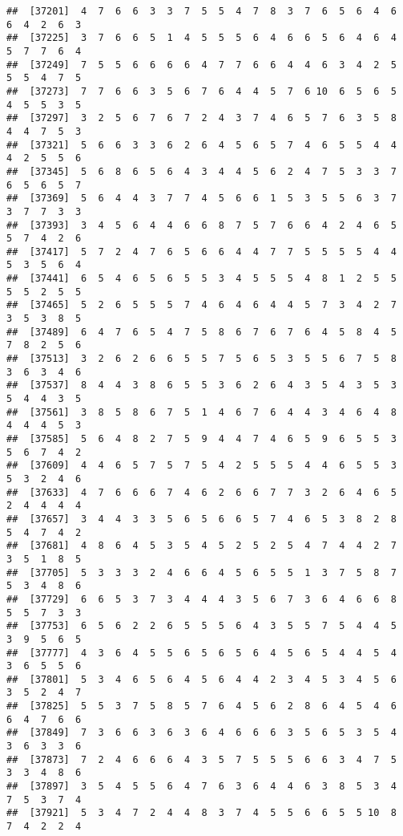 \documentclass[
]{book}
\begin{document}
\begin{verbatim}
##  [37201]  4  7  6  6  3  3  7  5  5  4  7  8  3  7  6  5  6  4  6  6  4  2  6  3
##  [37225]  3  7  6  6  5  1  4  5  5  5  6  4  6  6  5  6  4  6  4  5  7  7  6  4
##  [37249]  7  5  5  6  6  6  6  4  7  7  6  6  4  4  6  3  4  2  5  5  5  4  7  5
##  [37273]  7  7  6  6  3  5  6  7  6  4  4  5  7  6 10  6  5  6  5  4  5  5  3  5
##  [37297]  3  2  5  6  7  6  7  2  4  3  7  4  6  5  7  6  3  5  8  4  4  7  5  3
##  [37321]  5  6  6  3  3  6  2  6  4  5  6  5  7  4  6  5  5  4  4  4  2  5  5  6
##  [37345]  5  6  8  6  5  6  4  3  4  4  5  6  2  4  7  5  3  3  7  6  5  6  5  7
##  [37369]  5  6  4  4  3  7  7  4  5  6  6  1  5  3  5  5  6  3  7  3  7  7  3  3
##  [37393]  3  4  5  6  4  4  6  6  8  7  5  7  6  6  4  2  4  6  5  5  7  4  2  6
##  [37417]  5  7  2  4  7  6  5  6  6  4  4  7  7  5  5  5  5  4  4  5  3  5  6  4
##  [37441]  6  5  4  6  5  6  5  5  3  4  5  5  5  4  8  1  2  5  5  5  5  2  5  5
##  [37465]  5  2  6  5  5  5  7  4  6  4  6  4  4  5  7  3  4  2  7  3  5  3  8  5
##  [37489]  6  4  7  6  5  4  7  5  8  6  7  6  7  6  4  5  8  4  5  7  8  2  5  6
##  [37513]  3  2  6  2  6  6  5  5  7  5  6  5  3  5  5  6  7  5  8  3  6  3  4  6
##  [37537]  8  4  4  3  8  6  5  5  3  6  2  6  4  3  5  4  3  5  3  5  4  4  3  5
##  [37561]  3  8  5  8  6  7  5  1  4  6  7  6  4  4  3  4  6  4  8  4  4  4  5  3
##  [37585]  5  6  4  8  2  7  5  9  4  4  7  4  6  5  9  6  5  5  3  5  6  7  4  2
##  [37609]  4  4  6  5  7  5  7  5  4  2  5  5  5  4  4  6  5  5  3  5  3  2  4  6
##  [37633]  4  7  6  6  6  7  4  6  2  6  6  7  7  3  2  6  4  6  5  2  4  4  4  4
##  [37657]  3  4  4  3  3  5  6  5  6  6  5  7  4  6  5  3  8  2  8  5  4  7  4  2
##  [37681]  4  8  6  4  5  3  5  4  5  2  5  2  5  4  7  4  4  2  7  3  5  1  8  5
##  [37705]  5  3  3  3  2  4  6  6  4  5  6  5  5  1  3  7  5  8  7  5  3  4  8  6
##  [37729]  6  6  5  3  7  3  4  4  4  3  5  6  7  3  6  4  6  6  8  5  5  7  3  3
##  [37753]  6  5  6  2  2  6  5  5  5  6  4  3  5  5  7  5  4  4  5  3  9  5  6  5
##  [37777]  4  3  6  4  5  5  6  5  6  5  6  4  5  6  5  4  4  5  4  3  6  5  5  6
##  [37801]  5  3  4  6  5  6  4  5  6  4  4  2  3  4  5  3  4  5  6  3  5  2  4  7
##  [37825]  5  5  3  7  5  8  5  7  6  4  5  6  2  8  6  4  5  4  6  6  4  7  6  6
##  [37849]  7  3  6  6  3  6  3  6  4  6  6  6  3  5  6  5  3  5  4  3  6  3  3  6
##  [37873]  7  2  4  6  6  6  4  3  5  7  5  5  5  6  6  3  4  7  5  3  3  4  8  6
##  [37897]  3  5  4  5  5  6  4  7  6  3  6  4  4  6  3  8  5  3  4  7  5  3  7  4
##  [37921]  5  3  4  7  2  4  4  8  3  7  4  5  5  6  6  5  5 10  8  7  4  2  2  4

\end{verbatim}
\end{document}
